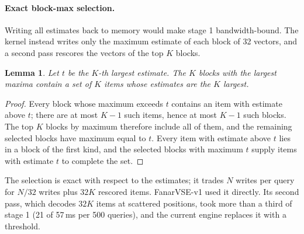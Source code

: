 \documentclass[fleqn,10pt]{wlscirep}
\newtheorem{lemma}{Lemma}
\begin{document}
\paragraph{Exact block-max selection.} Writing all estimates back to memory would make stage 1 bandwidth-bound. The kernel instead writes only the maximum estimate of each block of 32 vectors, and a second pass rescores the vectors of the top $K$ blocks.
\begin{lemma}
Let $t$ be the $K$-th largest estimate. The $K$ blocks with the largest maxima contain a set of $K$ items whose estimates are the $K$ largest.
\end{lemma}
\begin{proof}
Every block whose maximum exceeds $t$ contains an item with estimate above $t$; there are at most $K-1$ such items, hence at most $K-1$ such blocks. The top $K$ blocks by maximum therefore include all of them, and the remaining selected blocks have maximum equal to $t$. Every item with estimate above $t$ lies in a block of the first kind, and the selected blocks with maximum $t$ supply items with estimate $t$ to complete the set.
\end{proof}
The selection is exact with respect to the estimates; it trades $N$ writes per query for $N/32$ writes plus $32K$ rescored items. FanarVSE-v1 used it directly. Its second pass, which decodes $32K$ items at scattered positions, took more than a third of stage 1 (21 of 57\,ms per 500 queries), and the current engine replaces it with a threshold.
\end{document}
